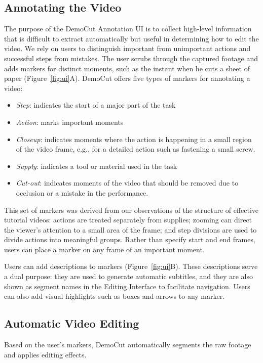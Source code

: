 \subsection{Annotating the Video}
The purpose of the DemoCut Annotation UI is to collect high-level information that is difficult to extract automatically but useful in determining how to edit the video.
We rely on users to distinguish important from unimportant actions and successful steps from mistakes.
The user scrubs through the captured footage and adds markers for distinct moments, such as the instant when he cuts a sheet of paper (Figure~\ref{fig:ui}A). DemoCut offers five types of markers for annotating a video:
\begin{itemize}
  \setlength{\itemsep}{0pt}
  \item \emph{Step}: indicates the start of a major part of the task
  \item \emph{Action}: marks important moments
  \item \emph{Closeup}: indicates moments where the action is happening in a small region of the video frame, e.g., for a detailed action such as fastening a small screw. %
  \item \emph{Supply}: indicates a tool or material used in the task
  \item \emph{Cut-out}: indicates moments of the video that should be removed due to occlusion or a mistake in the performance.
\end{itemize}
This set of markers was derived from our observations of the structure of effective tutorial videos: actions are treated separately from supplies; zooming can direct the viewer's attention to a small area of the frame; and step divisions are used to divide actions into meaningful groups. Rather than specify start and end frames, users can place a marker on any frame of an important moment.

Users can add descriptions to markers (Figure~\ref{fig:ui}B). These descriptions serve a dual purpose: they are used to generate automatic subtitles, and they are also shown as segment names in the Editing Interface to facilitate navigation. Users can also add visual highlights such as boxes and arrows to any marker.

\subsection{Automatic Video Editing}
Based on the user's markers, DemoCut automatically segments the raw footage and applies editing effects.


